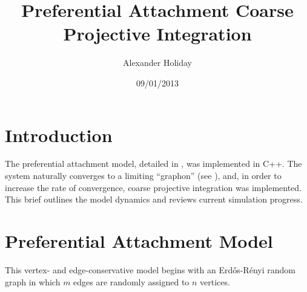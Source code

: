 \documentclass[11pt]{article}
\begin{document}
\title{Preferential Attachment Coarse Projective Integration}
\author{Alexander Holiday\vspace{-2ex}}
\date{09/01/2013}
\maketitle
\section*{Introduction}
The preferential attachment model, detailed in \cite{balasz:rsa12}, was implemented in C++. The system naturally converges to a limiting ``graphon'' (see \cite{lovasz:jcombth06}), and, in order to increase the rate of convergence, coarse projective integration was implemented. This brief outlines the model dynamics and reviews current simulation progress.
\section*{Preferential Attachment Model}
This vertex- and edge-conservative model begins with an Erd\H{o}s-R\'{e}nyi random graph in which $m$ edges are randomly assigned to $n$ vertices. 
\end{document}
